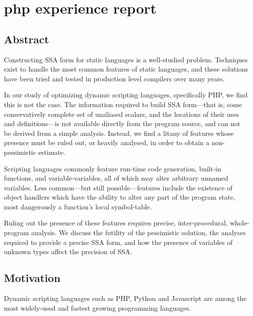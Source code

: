\chapter{php experience report }


\providecommand{\phc}{PHC}
\providecommand{\php}[1]{\textsf{#1}}
\providecommand{\pbterm}[1]{\textsf{#1}}
\providecommand{\chref}[1]{Chapter~#1}
\providecommand{\secref}[1]{Chapter~#1}
\providecommand{\figref}[1]{Figure~#1}

\section{Abstract}

Constructing SSA form for static languages is a well-studied problem.
Techniques exist to handle the most common features of static languages, and these solutions have been tried and tested in production level compilers over many years.

In our study of optimizing dynamic scripting languages, specifically PHP, we find this is not the case.
The information required to build SSA form---that is, some conservatively complete set of unaliased scalars, and the locations of their uses and definitions---is not available directly from the program source, and can not be derived from a simple analysis.
Instead, we find a litany of features whose presence must be ruled out, or heavily analysed, in order to obtain a non-pessimistic estimate.

Scripting languages commonly feature run-time code generation, built-in functions, and variable-variables, all of which may alter arbitrary unnamed variables.
Less common---but still possible---features include the existence of object handlers which have the ability to alter any part of the program state, most dangerously a function's local symbol-table.

Ruling out the presence of these features requires precise, inter-procedural, whole-program analysis.
We discuss the futility of the pessimistic solution, the analyses required to provide a precise SSA form, and how the presence of variables of unknown types affect the precision of SSA.

\section{Motivation}

Dynamic scripting languages such as PHP, Python and Javascript are among the most widely-used and fastest growing programming languages.

